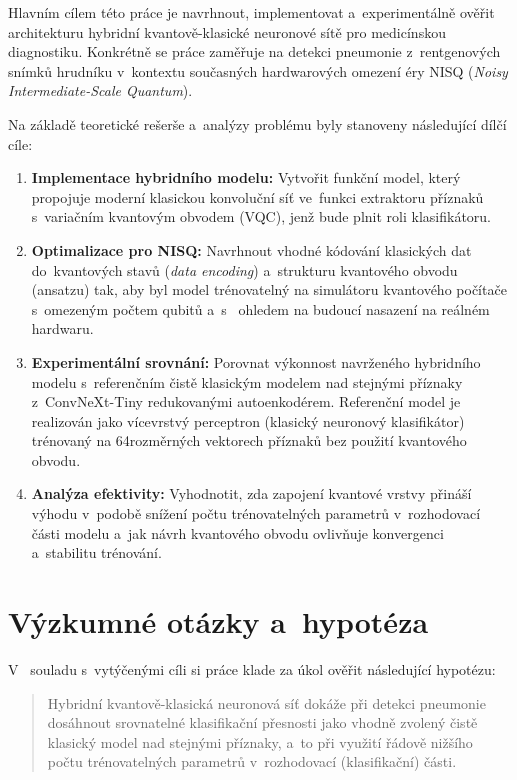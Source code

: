 \documentclass[12pt, a4paper]{report}
\begin{document}
Hlavním cílem této práce je navrhnout, implementovat a~experimentálně ověřit
architekturu hybridní kvantově-klasické neuronové sítě pro medicínskou
diagnostiku. Konkrétně se práce zaměřuje na detekci pneumonie z~rentgenových
snímků hrudníku v~kontextu současných hardwarových omezení éry NISQ
(\emph{Noisy Intermediate-Scale Quantum}).

Na základě teoretické rešerše a~analýzy problému byly stanoveny následující
dílčí cíle:

\begin{enumerate}
  \item \textbf{Implementace hybridního modelu:}
  Vytvořit funkční model, který propojuje moderní klasickou konvoluční síť
  ve~funkci extraktoru příznaků s~variačním kvantovým obvodem (VQC),
  jenž bude plnit roli klasifikátoru.

  \item \textbf{Optimalizace pro NISQ:}
  Navrhnout vhodné kódování klasických dat do~kvantových stavů
  (\emph{data encoding}) a~strukturu kvantového obvodu (ansatzu) tak, aby byl
  model trénovatelný na simulátoru kvantového počítače
  s~omezeným počtem qubitů a~s ~ohledem na budoucí nasazení na reálném hardwaru.

  \item \textbf{Experimentální srovnání:}
  Porovnat výkonnost navrženého hybridního modelu s~referenčním čistě
  klasickým modelem nad stejnými příznaky z~ConvNeXt-Tiny redukovanými autoenkodérem.
  Referenční model je realizován jako vícevrstvý perceptron (klasický
  neuronový klasifikátor) trénovaný na 64rozměrných vektorech příznaků
  bez použití kvantového obvodu.

  \item \textbf{Analýza efektivity:}
  Vyhodnotit, zda zapojení kvantové vrstvy přináší výhodu v~podobě snížení
  počtu trénovatelných parametrů v~rozhodovací části modelu a~jak návrh
  kvantového obvodu ovlivňuje konvergenci a~stabilitu trénování.
\end{enumerate}

\section*{Výzkumné otázky a~hypotéza}

V ~souladu s~vytýčenými cíli si práce klade za úkol ověřit následující
hypotézu:

\begin{quote}
Hybridní kvantově-klasická neuronová síť dokáže při detekci pneumonie
dosáhnout srovnatelné klasifikační přesnosti jako vhodně zvolený čistě
klasický model nad stejnými příznaky, a~to při využití řádově nižšího počtu
trénovatelných parametrů v~rozhodovací (klasifikační) části.
\end{quote}
\end{document}
